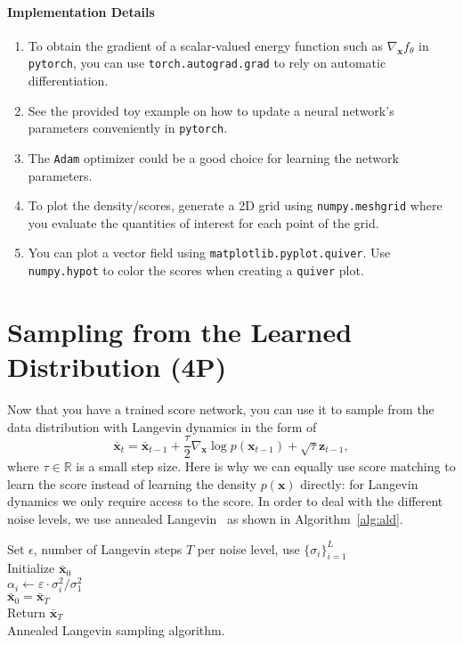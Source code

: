 \documentclass{article}
\newcommand{\R}{\mathbb{R}}
\renewcommand{\vec}[1]{\textbf{#1}}
\renewcommand{\vec}[1]{\textbf{#1}}
\begin{document}
\paragraph{Implementation Details}
\begin{enumerate}
\item To obtain the gradient of a scalar-valued energy function such as $\nabla_{\vec x} f_\theta$ in \texttt{pytorch}, you can use \texttt{torch.autograd.grad} to rely on automatic differentiation.
\item See the provided toy example on how to update a neural network's parameters conveniently in \texttt{pytorch}. 
\item The \texttt{Adam} optimizer could be a good choice for learning the network parameters.
\item To plot the density/scores, generate a 2D grid using \texttt{numpy.meshgrid} where you evaluate the quantities of interest for each point of the grid.
\item You can plot a vector field using \texttt{matplotlib.pyplot.quiver}. Use \texttt{numpy.hypot} to color the scores when creating a \texttt{quiver} plot. 
\end{enumerate}
\section{Sampling from the Learned Distribution (4P)}
Now that you have a trained score network, you can use it to sample from the data distribution with Langevin dynamics in the form of 
\[
\bar{\vec x}_t = \bar{\vec x}_{t-1} + \frac{\tau}{2} \nabla_{\vec x} \log p(\vec x_{t-1}) + \sqrt{\tau}\vec z_{t-1},
\]
where $\tau \in \R$ is a small step size. Here is why we can equally use score matching to learn the score instead of learning the density $p(\vec x)$ directly: for Langevin dynamics we only require access to the score. In order to deal with the different noise levels, we use annealed Langevin~\cite{song} as shown in Algorithm~\ref{alg:ald}. 

\begin{algorithm}[htb]
Set $\epsilon$, number of Langevin steps $T$ per noise level, use $\{\sigma_i\}_{i=1}^L$ \\
Initialize $\bar{\vec x}_0$ \\
{
$\alpha_i \leftarrow \varepsilon \cdot  \sigma_i^2/\sigma_1^2$ \\
\For{$t\leftarrow 1, \dots, T$}{
$\vec z_t \sim \mathcal{N}(\vec 0, \vec I)$\\
$\bar{\vec x}_t \leftarrow \bar{\vec x}_{t-1} - \frac{\alpha_i}{2} \nabla_{{\vec x}} f_\theta (\bar{\vec x}_{t-1} , \sigma_i)+  \sqrt{\alpha_i} \vec z_t$\\
}
$\bar{\vec x}_0 = \bar{\vec x}_T$\\
}
Return $\bar{\vec x}_T$\\
\caption{Annealed Langevin sampling algorithm.}\label{alg:ald}
\end{algorithm}
\end{document}
